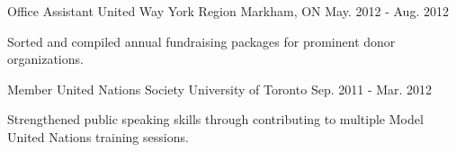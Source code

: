 \begin{cventries}
  \cventry
    {Office Assistant } %
    {United Way York Region} %
    {Markham, ON} %
    {May. 2012 - Aug. 2012} %
    {
      \begin{cvitems} %
        \item {Sorted and compiled annual fundraising packages for prominent donor organizations.}
      \end{cvitems}
    }      
    
  \cventry
    {Member} %
    {United Nations Society} %
    {University of Toronto} %
    {Sep. 2011 - Mar. 2012} %
    {
      \begin{cvitems} %
        \item {Strengthened public speaking skills through contributing to multiple Model United Nations training sessions.}
        \vspace{20mm}
      \end{cvitems}
    }     
\end{cventries}
